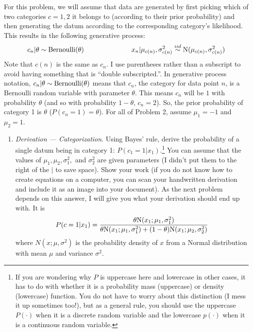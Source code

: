 \documentclass[11pt]{article}
\begin{document}
\begin{enumerate}
For this problem, we will assume that data are generated by first picking which of two categories $c=1,2$ it belongs to (according to their prior probability) and then generating the datum according to the corresponding category's likelihood. This results in the following generative process:
\begin{align*}
c_n | \theta \sim {\rm Bernoulli}(\theta)   & \qquad \qquad \qquad & x_n | \mu_{c(n)}, \sigma_{c(n)}^2 \overset{iid}{\sim} {\rm N}(\mu_{c(n)}, \sigma_{c(n)}^2)
\end{align*}
Note that $c(n)$ is the same as $c_n$. I use parentheses rather than a subscript to avoid having something that is 
``double subscripted.''. In generative process notation, $c_n | \theta \sim {\rm Bernoulli}(\theta)$ means that $c_n$, the category for data point $n$, is a Bernoulli random variable with parameter $\theta$. This means $c_n$ will be $1$ with probability $\theta$ (and so with probability $1-\theta$, $c_n=2$). So, the prior probability of category 1 is $\theta$ ($P(c_n=1)=\theta$). For all of Problem 2, assume $\mu_1=-1$ and $\mu_2=1$.
\begin{enumerate}
\item {\em Derivation --- Categorization}. Using Bayes' rule, derive the probability of a single datum being in category 1: $P(c_1=1|x_1)$.\footnote{If you are wondering why $P$ is uppercase here and lowercase in other cases, it has to do with whether it is a probability mass (uppercase) or density (lowercase) function. You do not have to worry about this distinction (I mess it up sometimes too!), but as a general rule, you should use the uppercase $P(\cdot)$ when it is a discrete random variable and the lowercase $p(\cdot)$ when it is a continuous random variable.} You can assume that the values of $\mu_1, \mu_2, \sigma^2_1,$ and $\sigma^2_2$ are given parameters (I didn't put them to the right of the $|$ to save space). Show your work (if you do not know how to create equations on a computer, you can scan your handwritten derivation and include it as an image into your document). As the next problem depends on this answer, I will give you what your derivation should end up with. It is
\begin{equation*}
P(c=1|x_1) = \frac{\theta {\rm N}(x_1; \mu_1, \sigma_1^2)}{\theta {\rm N}(x_1; \mu_1, \sigma_1^2) + (1-\theta){\rm N}(x_1; \mu_2, \sigma_2^2)}
\end{equation*}
where $N(x;\mu,\sigma^2)$ is the probability density of $x$ from a Normal distribution with mean $\mu$ and variance $\sigma^2$.


\end{enumerate}
\end{enumerate}
\end{document}
